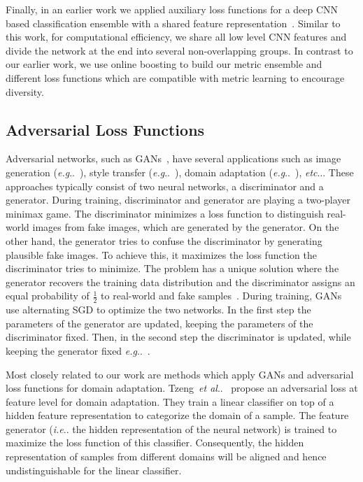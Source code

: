 \documentclass[10pt,journal,compsoc]{IEEEtran}
\makeatletter
\DeclareRobustCommand\onedot{\futurelet\@let@token\@onedot}
\def\@onedot{\ifx\@let@token.\else.\null\fi\xspace}
\def\eg{\emph{e.g}\onedot} \def\Eg{\emph{E.g}\onedot}
\def\ie{\emph{i.e}\onedot} \def\Ie{\emph{I.e}\onedot}
\def\etc{\emph{etc}\onedot} \def\vs{\emph{vs}\onedot}
\def\etal{\emph{et al}\onedot}
\makeatother
\begin{document}
Finally, in an earlier work we applied auxiliary loss functions for
a deep \ac{CNN} based classification ensemble with a shared feature
representation~\cite{opitz2016accv}. Similar to this work, for computational efficiency, we share all low level \ac{CNN} features 
and divide the network at the end into several non-overlapping groups. In contrast to our earlier work, we use online boosting to build
our metric ensemble and different loss functions which are compatible with metric
learning to encourage diversity.

\subsection{Adversarial Loss Functions}\label{sec:related-work-adversarial}

Adversarial networks, such as \acp{GAN}~\cite{goodfellow2014generative}, have several applications such as image
generation (\eg~\cite{goodfellow2014generative, radford2016dcgan, mao2017least}), style transfer (\eg~\cite{CycleGAN2017}), 
domain adaptation (\eg~\cite{tzeng2017adversarial}), \etc.
These approaches typically consist of two neural networks, a discriminator and a generator. 
During training, discriminator and generator are playing a two-player minimax game.
The discriminator minimizes a loss function to distinguish real-world images from 
fake images, which are generated by the generator.
On the other hand, the generator tries to confuse the discriminator by
generating plausible fake images. To achieve this, it maximizes the loss
function the discriminator tries to minimize. The problem has a unique solution
where the generator recovers the training data distribution and the
discriminator assigns an equal probability of $\frac{1}{2}$ to real-world and
fake samples~\cite{goodfellow2014generative}.
During training, \acp{GAN} use alternating \ac{SGD} to optimize the two networks. In the first step the parameters of the generator are updated, keeping the parameters of the discriminator fixed. Then, in the second step the discriminator is updated, while keeping the generator fixed
\eg~\cite{goodfellow2014generative, CycleGAN2017, radford2016dcgan, mao2017least}.

Most closely related to our work are methods which apply \acp{GAN} and adversarial loss
functions for domain adaptation.
Tzeng~\etal~\cite{tzeng2015simultaneous} propose an adversarial loss at
feature level for domain adaptation. They train a linear classifier on top of a
hidden feature representation to categorize the domain of a sample. The feature
generator (\ie the hidden representation of the neural network) is trained to maximize the
loss function of this classifier. Consequently, the hidden
representation of samples from different domains will be aligned and hence undistinguishable for the linear classifier.
\end{document}
